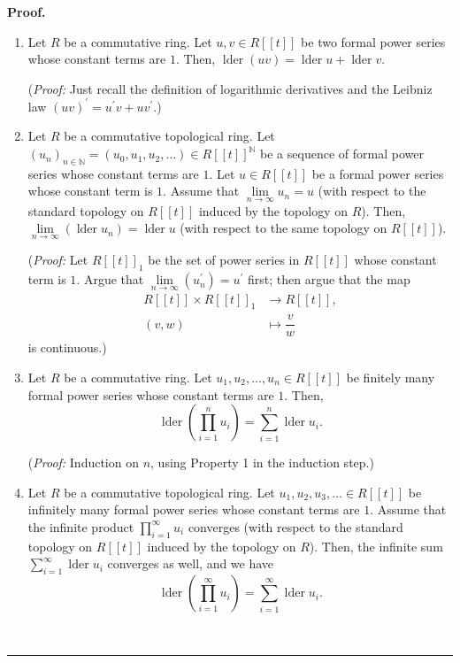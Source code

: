 \documentclass[numbers=enddot,12pt,final,onecolumn,notitlepage]{scrartcl}%
\theoremstyle{definition}
\newenvironment{proof}[1][Proof]{\noindent\textbf{#1.} }{\ \rule{0.5em}{0.5em}}
\let\sumnonlimits\sum
\let\prodnonlimits\prod
\renewcommand{\sum}{\sumnonlimits\limits}
\renewcommand{\prod}{\prodnonlimits\limits}
\newenvironment{vershort}{}{}
\begin{document}
\begin{vershort}
\begin{proof}
\begin{enumerate}
\item Let $R$ be a commutative ring. Let $u,v\in R\left[  \left[  t\right]
\right]  $ be two formal power series whose constant terms are $1$. Then,
$\operatorname*{lder}\left(  uv\right)  =\operatorname*{lder}%
u+\operatorname*{lder}v$.

(\textit{Proof:} Just recall the definition of logarithmic derivatives and the
Leibniz law $\left(  uv\right)  ^{\prime}=u^{\prime}v+uv^{\prime}$.)

\item Let $R$ be a commutative topological ring. Let $\left(  u_{n}\right)
_{n\in\mathbb{N}}=\left(  u_{0},u_{1},u_{2},\ldots\right)  \in R\left[
\left[  t\right]  \right]  ^{\mathbb{N}}$ be a sequence of formal power series
whose constant terms are $1$. Let $u\in R\left[  \left[  t\right]  \right]  $
be a formal power series whose constant term is $1$. Assume that
$\lim\limits_{n\rightarrow\infty}u_{n}=u$ (with respect to the standard
topology on $R\left[  \left[  t\right]  \right]  $ induced by the topology on
$R$). Then, $\lim\limits_{n\rightarrow\infty}\left(  \operatorname*{lder}%
u_{n}\right)  =\operatorname*{lder}u$ (with respect to the same topology on
$R\left[  \left[  t\right]  \right]  $).

(\textit{Proof:} Let $R\left[  \left[  t\right]  \right]  _{1}$ be the set of
power series in $R\left[  \left[  t\right]  \right]  $ whose constant term is
$1$. Argue that $\lim\limits_{n\rightarrow\infty}\left(  u_{n}^{\prime
}\right)  =u^{\prime}$ first; then argue that the map%
\begin{align*}
R\left[  \left[  t\right]  \right]  \times R\left[  \left[  t\right]  \right]
_{1}  &  \rightarrow R\left[  \left[  t\right]  \right]  ,\\
\left(  v,w\right)   &  \mapsto\dfrac{v}{w}%
\end{align*}
is continuous.)

\item Let $R$ be a commutative ring. Let $u_{1},u_{2},\ldots,u_{n}\in R\left[
\left[  t\right]  \right]  $ be finitely many formal power series whose
constant terms are $1$. Then,%
\[
\operatorname*{lder}\left(  \prod_{i=1}^{n}u_{i}\right)  =\sum_{i=1}%
^{n}\operatorname*{lder}u_{i}.
\]


(\textit{Proof:} Induction on $n$, using Property 1 in the induction step.)

\item Let $R$ be a commutative topological ring. Let $u_{1},u_{2},u_{3}%
,\ldots\in R\left[  \left[  t\right]  \right]  $ be infinitely many formal
power series whose constant terms are $1$. Assume that the infinite product
$\prod_{i=1}^{\infty}u_{i}$ converges (with respect to the standard topology
on $R\left[  \left[  t\right]  \right]  $ induced by the topology on $R$).
Then, the infinite sum $\sum_{i=1}^{\infty}\operatorname*{lder}u_{i}$
converges as well, and we have%
\[
\operatorname*{lder}\left(  \prod_{i=1}^{\infty}u_{i}\right)  =\sum
_{i=1}^{\infty}\operatorname*{lder}u_{i}.
\]



\end{enumerate}
\end{proof}
\end{vershort}
\end{document}
